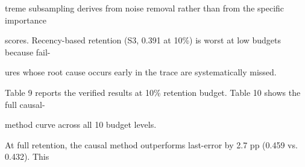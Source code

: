 \begin{flushleft}
\noindent  treme subsampling derives from noise removal rather than from the specific importance\par
\noindent  scores. Recency-based retention (S3, 0.391 at 10\%) is worst at low budgets because fail-\par
\noindent  ures whose root cause occurs early in the trace are systematically missed.\par
\noindent  Table 9 reports the verified results at 10\% retention budget. Table 10 shows the full causal-\par
\noindent method curve across all 10 budget levels.\par
\noindent  At full retention, the causal method outperforms last-error by 2.7 pp (0.459 vs. 0.432). This\par
\end{flushleft}
